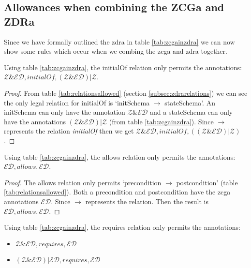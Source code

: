 \subsection{Allowances when combining the ZCGa and ZDRa}

Since we have formally outlined the \gls{zdra} in table \ref{tab:zcgainzdra} we
can now show some rules which occur when we combing the \gls{zcga} and
\gls{zdra} together.

\begin{thm}
Using table \ref{tab:zcgainzdra}, the initialOf relation only permits the
annotations: \\
 $\mathcal{Z} \& \mathcal{ED}, initialOf, (\mathcal{Z} \& \mathcal{ED}) |
 \mathcal{Z}$.
\end{thm}

\begin{proof}
From table \ref{tab:relationsallowed} (section \ref{subsec:zdrarelations}) we
can see the only legal relation for initialOf is `initSchema $\longrightarrow$
stateSchema'. An initSchema can only have the annotation $\mathcal{Z} \&
\mathcal{ED}$ and a stateSchema can only have the annotations $(\mathcal{Z} \&
\mathcal{ED}) | \mathcal{Z}$ (from table \ref{tab:zcgainzdra}). Since
$\longrightarrow$ represents the relation \emph{initialOf} then we get
$\mathcal{Z} \& \mathcal{ED}, initialOf, ((\mathcal{Z} \& \mathcal{ED}) |
\mathcal{Z})$.
\end{proof}

\begin{thm}
Using table \ref{tab:zcgainzdra}, the allows relation only permits the
annotations: \\
$\mathcal{ED}, allows, \mathcal{ED}$.
\end{thm}

\begin{proof}
The allows relation only permits `precondition $\longrightarrow$ postcondition'
(table \ref{tab:relationsallowed}). Both a precondition and postcondition have
the \gls{zcga} annotations $\mathcal{ED}$. Since $\longrightarrow$ represents
the relation. Then the result is $\mathcal{ED}, allows, \mathcal{ED}$.
\end{proof}

\begin{thm}
Using table \ref{tab:zcgainzdra}, the requires relation only permits the
annotations:
\begin{itemize}
\item $\mathcal{Z} \& \mathcal{ED}, requires, \mathcal{ED}$
\item $(\mathcal{Z} \& \mathcal{ED}) | \mathcal{ED}, requires, \mathcal{ED}$
\end{itemize}
\end{thm}

